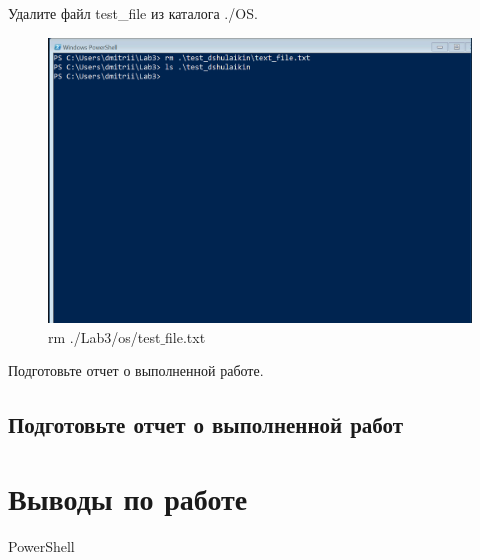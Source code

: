 \documentclass[a4paper]{article}
\begin{document}
Удалите файл test\_file из каталога ./OS.

\begin{figure}[H]
    \centering
    \includegraphics[width=\linewidth]{29.png}
    \caption{rm ./Lab3/os/test$\_$file.txt}
\end{figure}


Подготовьте отчет о выполненной работе.
\subsection{Подготовьте отчет о выполненной работ}


\section{Выводы по работе}

PowerShell
\end{document}
